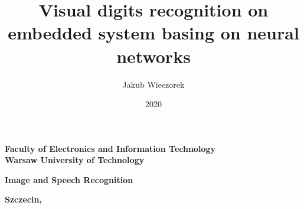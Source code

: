 \documentclass[a4paper,titlepage,11pt,twosides,floatssmall]{mwrep}
\begin{document}
	
	\frenchspacing
	\makeatletter
	\def\ps@uheadings{%
		\let\@mkboth\markboth
		\let\ps@normal\hf@uheadings
		\let\ps@opening\hf@plain
		\let\ps@closing\hf@uheadings
		\let\ps@blank\hf@empty
		\ps@normal
		\def\chaptermark##1{%
			\markright{%
				\ifHeadingNumbered
				\thechapter.\enspace
				\fi
				##1}}}
	
	\pagestyle{uheadings}
	
	\title{\bf Visual digits recognition on embedded system basing on neural networks\vskip 0.1cm}
	\author{Jakub Wieczorek}

	\date{2020}
	
	\makeatletter
	\renewcommand{\maketitle}{\begin{titlepage}
			\begin{center}{\LARGE {\bf
						Faculty of Electronics and Information Technology}}\\
				\vspace{0.4cm}
				{\LARGE {\bf Warsaw University of Technology}}\\
				\vspace{0.3cm}
			\end{center}
			\vspace{5cm}
			\begin{center}
				{\bf \LARGE Image and Speech Recognition\vskip 0.1cm}
			\end{center}
			\vspace{1cm}
			\begin{center}
				{\bf \LARGE \@title}
			\end{center}
			\vspace{2cm}
			\begin{center}
				{\bf \Large \@author \par}
			\end{center}
			\vspace*{\stretch{6}}
			\begin{center}
				\bf{\large{Szczecin, \@date\vskip 0.1cm}}
			\end{center}
		\end{titlepage}
	}

	\makeatother
	
	\newcommand{\at}[2][]{#1|_{#2}}
	
	\maketitle
	
	\tableofcontents
	\setcounter{page}{2}
	

	
    
    
	\listoffigures
	\begingroup
	\let\clearpage\relax
	\listoftables
	\endgroup
\end{document}
